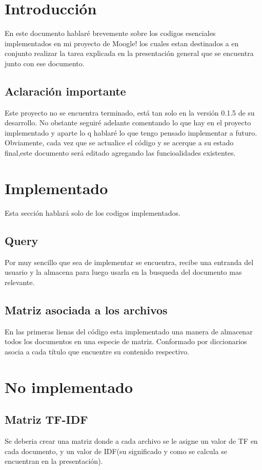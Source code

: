 \documentclass[100t]{article}
\begin{document}
\maketitle
\section{Introducción}
En este documento hablaré brevemente sobre los codigos esenciales implementados en mi proyecto de Moogle! los cuales estan destinados a en conjunto realizar la tarea explicada en la presentación general que se encuentra junto con ese documento.
\subsection{Aclaración importante}
Este proyecto no se encuentra terminado, está tan solo en la versión 0.1.5 de su desarrollo. No obstante seguiré adelante comentando lo que hay en el proyecto implementado y aparte lo q hablaré lo que tengo pensado implementar a futuro. Obviamente, cada vez que se actualice el código y se acerque a su estado final,este documento será editado agregando las funcioalidades existentes.
\section{Implementado}
Esta sección hablará solo de los codigos implementados.
\subsection{Query}
Por muy sencillo que sea de implementar se encuentra, recibe una entranda del usuario y la almacena para luego usarla en la busqueda del documento mas relevante.
\subsection{Matriz asociada a los archivos}
En las primeras lienas del código esta implementado una manera de almacenar todos los documentos en una especie de matriz. Conformado por diccionarios asocia a cada título que encuentre su contenido respectivo.
\section{No implementado}
\subsection{Matriz TF-IDF}
Se deberia crear una matriz donde a cada archivo se le asigne un valor de TF en cada documento, y un valor de IDF(su significado y como se calcula se encuentran en la presentación).
\end{document}
